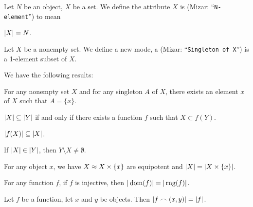 \documentclass{article}
\begin{document}
\skipdefn

\begin{definition}
Let $N$ be an object, $X$ be a set. We define the attribute $X$ is
 (Mizar: ``\verb#N-element#'') to mean
\begin{defn}[start=7]
\item $|X|=N$.
\end{defn}
\end{definition}

\begin{definition}
Let $X$ be a nonempty set.
We define a new mode, a  (Mizar:
``\verb#Singleton of X#'') is a 1-element subset of $X$.
\end{definition}

We have the following results:
\begin{thm}
\item\label{card1:65} For any nonempty set $X$ and for any singleton $A$
  of $X$, there exists an element $x$ of $X$ such that $A=\{x\}$.
\item\label{card1:66} $|X|\subseteq|Y|$ if and only if there
  exists a function $f$ such that $X\subset f(Y)$.
\item\label{card1:67} $|f(X)|\subseteq|X|$.
\item\label{card1:68} If $|X|\in|Y|$, then $Y\setminus X\neq\emptyset$.
\item\label{card1:69} For any object $x$, we have $X\approx X\times\{x\}$
  are equipotent and $|X|=|X\times\{x\}|$.
\item\label{card1:70} For any function $f$, if $f$ is injective, then $|\operatorname{dom}(f)|=|\operatorname{rng}(f)|$.
\item\label{card1:71} Let $f$ be a function, let $x$ and $y$ be objects.
  Then $|f\frown(x,y)|=|f|$.
\end{thm}
\end{document}
